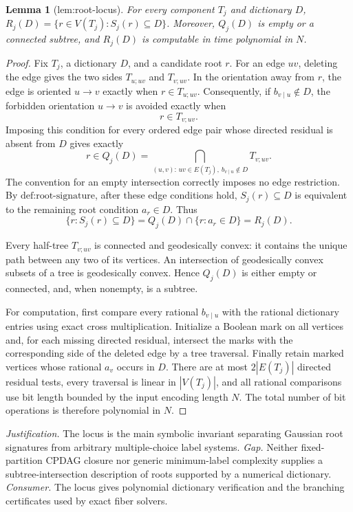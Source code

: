 \documentclass{article}
\newtheorem{lemma}{Lemma}
\begin{document}
\begin{lemma}[lem:root-locus]\label{lem:root-locus}
For every component \(T_j\) and dictionary \(D\), \(R_j(D)=\{r\in V(T_j):S_j(r)\subseteq D\}\). Moreover, \(Q_j(D)\) is empty or a connected subtree, and \(R_j(D)\) is computable in time polynomial in \(N\).
\end{lemma}
\begin{proof}
Fix \(T_j\), a dictionary \(D\), and a candidate root \(r\).  For an edge \(uv\), deleting the edge gives the two sides \(T_{u;uv}\) and \(T_{v;uv}\).  In the orientation away from \(r\), the edge is oriented \(u\to v\) exactly when \(r\in T_{u;uv}\).  Consequently, if \(b_{v\mid u}\notin D\), the forbidden orientation \(u\to v\) is avoided exactly when
\[
 r\in T_{v;uv}.
\]
Imposing this condition for every ordered edge pair whose directed residual is absent from \(D\) gives exactly
\[
 r\in Q_j(D)
 =\bigcap_{(u,v):\,uv\in E(T_j),\ b_{v\mid u}\notin D}T_{v;uv}.
\]
The convention for an empty intersection correctly imposes no edge restriction.  By \(\text{def:root-signature}\), after these edge conditions hold, \(S_j(r)\subseteq D\) is equivalent to the remaining root condition \(a_r\in D\).  Thus
\[
 \{r:S_j(r)\subseteq D\}
 =Q_j(D)\cap\{r:a_r\in D\}=R_j(D).
\]

Every half-tree \(T_{v;uv}\) is connected and geodesically convex: it contains the unique path between any two of its vertices.  An intersection of geodesically convex subsets of a tree is geodesically convex.  Hence \(Q_j(D)\) is either empty or connected, and, when nonempty, is a subtree.

For computation, first compare every rational \(b_{v\mid u}\) with the rational dictionary entries using exact cross multiplication.  Initialize a Boolean mark on all vertices and, for each missing directed residual, intersect the marks with the corresponding side of the deleted edge by a tree traversal.  Finally retain marked vertices whose rational \(a_v\) occurs in \(D\).  There are at most \(2|E(T_j)|\) directed residual tests, every traversal is linear in \(|V(T_j)|\), and all rational comparisons use bit length bounded by the input encoding length \(N\).  The total number of bit operations is therefore polynomial in \(N\).
\end{proof}
\par\smallskip\noindent \textit{Justification.} The locus is the main symbolic invariant separating Gaussian root signatures from arbitrary multiple-choice label systems. \textit{Gap.} Neither fixed-partition CPDAG closure nor generic minimum-label complexity supplies a subtree-intersection description of roots supported by a numerical dictionary. \textit{Consumer.} The locus gives polynomial dictionary verification and the branching certificates used by exact fiber solvers.
\end{document}
